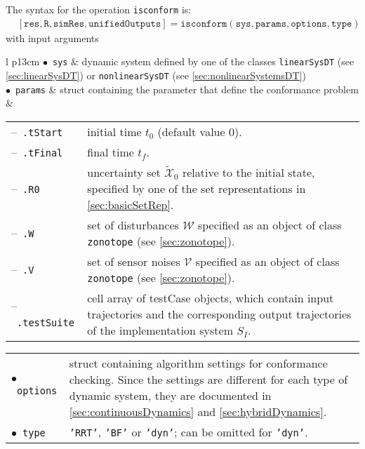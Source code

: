 The syntax for the operation \texttt{isconform} is:
\begin{equation*}
\begin{split}
    & [\texttt{res}, \texttt{R}, \texttt{simRes}, \texttt{unifiedOutputs}] = \texttt{isconform}(\texttt{sys},\texttt{params},\texttt{options},\texttt{type})
\end{split}
\end{equation*}
with input arguments

\begin{center}
\renewcommand{\arraystretch}{1.3}
\begin{tabular}[t]{l p{13cm} }
	$\bullet$~\texttt{sys} & dynamic system defined by one of the classes \texttt{linearSysDT} (see \cref{sec:linearSysDT}) or \texttt{nonlinearSysDT} (see \cref{sec:nonlinearSystemsDT}) \\
	$\bullet$~\texttt{params} & struct containing the parameter that define the conformance problem \\
	& \begin{tabular}[t]{l p{10cm}}
	 	--~\texttt{.tStart} & initial time $t_0$ (default value 0). \\
	 	--~\texttt{.tFinal} & final time $t_f$. \\
	 	--~\texttt{.R0} & uncertainty set $\tilde{\mathcal{X}}_0$ relative to the initial state, specified by one of the set representations in \cref{sec:basicSetRep}.\\
	 	--~\texttt{.W} & set of disturbances $\mathcal{W}$ specified as an object of class \texttt{zonotope} (see \cref{sec:zonotope}). \\
	 	--~\texttt{.V} & set of sensor noises $\mathcal{V}$ specified as an object of class \texttt{zonotope} (see \cref{sec:zonotope}).  \\
	 	--~\texttt{.testSuite} & cell array of testCase objects, which contain input trajectories and the corresponding output trajectories of the implementation system $S_I$.
	 \end{tabular}
 \end{tabular}
\begin{tabular}[t]{l p{13cm} }
	$\bullet$~\texttt{options} & struct containing algorithm settings for conformance checking. Since the settings are different for each type of dynamic system, they are documented in \cref{sec:continuousDynamics} and \cref{sec:hybridDynamics}. \\
	 $\bullet$~\texttt{type} & \texttt{'RRT'}, \texttt{'BF'} or \texttt{'dyn'}; can be omitted for \texttt{'dyn'}.
\end{tabular}
\end{center}

